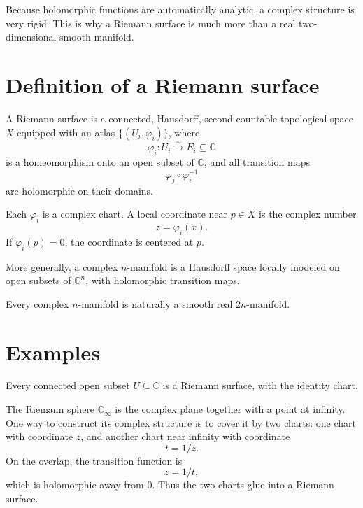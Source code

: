 \begin{remark}
Because holomorphic functions are automatically analytic, a complex structure is very rigid.  This is why a Riemann surface is much more than a real two-dimensional smooth manifold.
\end{remark}

\section{Definition of a Riemann surface}

\begin{definition}
A Riemann surface is a connected, Hausdorff, second-countable topological space \(X\) equipped with an atlas \(\{(U_i,\varphi_i)\}\), where
\[
  \varphi_i:U_i\xrightarrow{\sim}E_i\subseteq\mathbb C
\]
is a homeomorphism onto an open subset of \(\mathbb C\), and all transition maps
\[
  \varphi_j\circ\varphi_i^{-1}
\]
are holomorphic on their domains.
\end{definition}

Each \(\varphi_i\) is a complex chart.  A local coordinate near \(p\in X\) is the complex number
\[
  z=\varphi_i(x).
\]
If \(\varphi_i(p)=0\), the coordinate is centered at \(p\).

\begin{definition}
More generally, a complex \(n\)-manifold is a Hausdorff space locally modeled on open subsets of \(\mathbb C^n\), with holomorphic transition maps.
\end{definition}

Every complex \(n\)-manifold is naturally a smooth real \(2n\)-manifold.

\section{Examples}

\begin{example}
Every connected open subset \(U\subseteq\mathbb C\) is a Riemann surface, with the identity chart.
\end{example}

\begin{example}
The Riemann sphere \(\mathbb C_\infty\) is the complex plane together with a point at infinity.  One way to construct its complex structure is to cover it by two charts: one chart with coordinate \(z\), and another chart near infinity with coordinate
\[
  t=1/z.
\]
On the overlap, the transition function is
\[
  z=1/t,
\]
which is holomorphic away from \(0\).  Thus the two charts glue into a Riemann surface.
\end{example}

